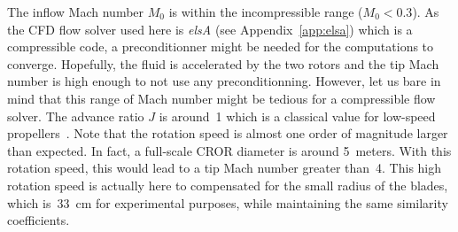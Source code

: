 The inflow Mach number $M_0$ is within the incompressible range
($M_0 < 0.3$). As the CFD flow solver used here is \emph{elsA}
(see Appendix~\ref{app:elsa}) which is a compressible code, 
a preconditionner might be needed for the computations to converge. 
Hopefully, the fluid is accelerated by the two rotors
and the tip Mach number is high enough to not use any preconditionning.
However, let us bare in mind that this range of Mach number might
be tedious for a compressible flow solver.
The advance ratio $J$ is around~1 which is a classical value for
low-speed propellers~\cite{Bousquet2012}. Note that the rotation speed is almost
one order of magnitude larger than expected. 
In fact, a full-scale CROR diameter is around 5~meters. With this rotation speed,
this would lead to a tip Mach number greater than~4. This high rotation speed is 
actually here to compensated for the small radius of the blades, which is~33~cm
for experimental purposes, while maintaining the same similarity coefficients.
